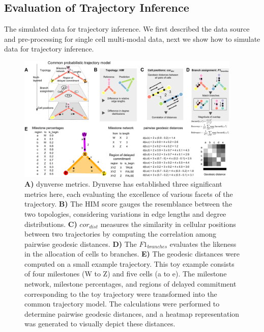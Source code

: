 \subsection{Evaluation of Trajectory Inference}
\label{chapter:PHLOWER_bench:metrics}
The simulated data for trajectory inference. We first described the data source and pre-processing for single cell multi-modal data, next we show how to simulate data for trajectory inference.
\begin{figure}[!h]
	\centering
	\includegraphics[width=0.95\textwidth]{dynverse_metrics/fig}
	\vspace{0.1cm}
	\caption[Dynverse metrics]{ \textbf{A)} dynverse metrics. Dynverse has established three significant metrics here, each evaluating the excellence of various facets of the trajectory. \textbf{B)} The HIM score gauges the resemblance between the two topologies, considering variations in edge lengths and degree distributions. \textbf{C)} $cor_{dist}$ measures the similarity in cellular positions between two trajectories by computing the correlation among pairwise geodesic distances. \textbf{D)} The $F1_{branches}$ evaluates the likeness in the allocation of cells to branches. \textbf{E)} The geodesic distances were computed on a small example trajectory. This toy example consists of four milestones (W to Z) and five cells (a to e). The milestone network, milestone percentages, and regions of delayed commitment corresponding to the toy trajectory were transformed into the common trajectory model. The calculations were performed to determine pairwise geodesic distances, and a heatmap representation was generated to visually depict these distances.}
	\label{fig:dynverse_metrics}
\end{figure}

